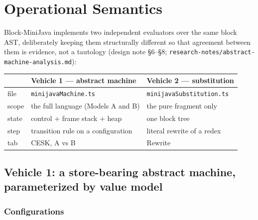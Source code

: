 \documentclass[11pt]{article}
\begin{document}
\section{Operational Semantics}
\label{sec:eval}

Block-MiniJava implements two independent evaluators over the same block
AST, deliberately keeping them structurally different so that agreement
between them is evidence, not a tautology (design note \S6--\S8;
\texttt{research-notes/abstract-machine-analysis.md}):

\begin{center}
\begin{tabular}{@{}lll@{}}
\toprule
 & \textbf{Vehicle 1 --- abstract machine} & \textbf{Vehicle 2 --- substitution} \\
\midrule
file & \texttt{minijavaMachine.ts} & \texttt{minijavaSubstitution.ts} \\
scope & the full language (Models A and B) & the pure fragment only \\
state & control + frame stack + heap & one block tree \\
step & transition rule on a configuration & literal rewrite of a redex \\
tab & CESK, A vs B & Rewrite \\
\bottomrule
\end{tabular}
\end{center}

\subsection{Vehicle 1: a store-bearing abstract machine, parameterized by value model}

\subsubsection{Configurations}
\end{document}
